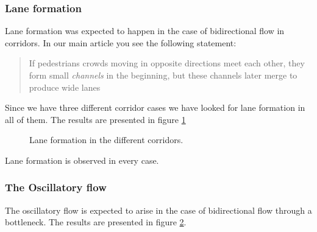 \subsubsection{Lane formation}
Lane formation was expected to happen in the case of bidirectional
flow in corridors. In our main article you see the following statement:

\begin{quote}
If pedestrians crowds moving in opposite directions meet each other,
they form small \emph{channels} in the beginning, but these channels
later merge to produce wide lanes
\end{quote}

Since we have three different corridor cases we have
looked for lane formation in all of them. The results are presented in
figure \ref{fig:laneformation}

\begin{figure}[h]
\centering
\subfloat[]{\resizebox{5cm}{!}{}}
\subfloat[]{\resizebox{5cm}{!}{}}
\subfloat[]{\resizebox{5cm}{!}{}}
\caption{Lane formation in the different corridors.}
\label{fig:laneformation}
\end{figure}

Lane formation is observed in every case.

\subsubsection{The Oscillatory flow}
The oscillatory flow is expected to arise in the case of bidirectional
flow through a bottleneck. The results are presented in figure
\ref{fig:oscillitoryflow}.

\begin{figure}[h]
\centering
{}
\caption{}
\label{fig:oscillitoryflow}
\end{figure}

